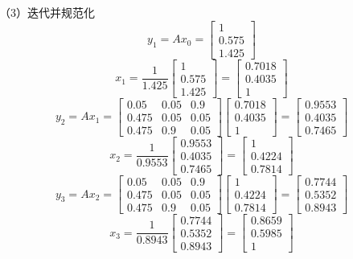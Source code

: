 \documentclass[UTF8,12pt,a4paper,fontset=fandol]{ctexart}
\begin{document}
（3）迭代并规范化
\[
y_1=Ax_0=
\begin{bmatrix}
1\\
0.575\\
1.425
\end{bmatrix}
\]
\[
x_1=\frac{1}{1.425}
\begin{bmatrix}
1\\
0.575\\
1.425
\end{bmatrix}
=
\begin{bmatrix}
0.7018\\
0.4035\\
1
\end{bmatrix}
\]
\[
y_2=Ax_1=
\begin{bmatrix}
0.05 & 0.05 & 0.9\\
0.475 & 0.05 & 0.05\\
0.475 & 0.9 & 0.05
\end{bmatrix}
\begin{bmatrix}
0.7018\\
0.4035\\
1
\end{bmatrix}
=
\begin{bmatrix}
0.9553\\
0.4035\\
0.7465
\end{bmatrix}
\]
\[
x_2=\frac{1}{0.9553}
\begin{bmatrix}
0.9553\\
0.4035\\
0.7465
\end{bmatrix}
=
\begin{bmatrix}
1\\
0.4224\\
0.7814
\end{bmatrix}
\]
\[
y_3=Ax_2=
\begin{bmatrix}
0.05 & 0.05 & 0.9\\
0.475 & 0.05 & 0.05\\
0.475 & 0.9 & 0.05
\end{bmatrix}
\begin{bmatrix}
1\\
0.4224\\
0.7814
\end{bmatrix}
=
\begin{bmatrix}
0.7744\\
0.5352\\
0.8943
\end{bmatrix}
\]
\[
x_3=\frac{1}{0.8943}
\begin{bmatrix}
0.7744\\
0.5352\\
0.8943
\end{bmatrix}
=
\begin{bmatrix}
0.8659\\
0.5985\\
1
\end{bmatrix}
\]
\end{document}
